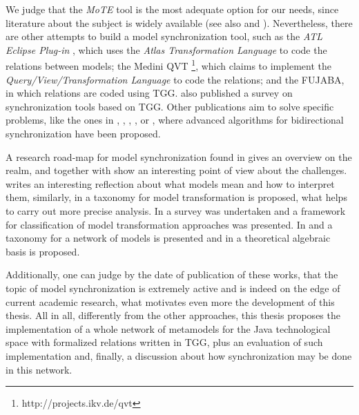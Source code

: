 \documentclass[tuberlin,cic,tc,english,noabntcite,oneside]{iiufrgs}
\begin{document}
We judge that the \emph{MoTE} tool is the most adequate option for our needs, since literature about the subject is widely available (see also \citealp{giese2009efficient} and \citealp{hildebrandt2012mdelab}). Nevertheless, there are other attempts to build a model synchronization tool, such as the \emph{ATL Eclipse Plug-in} \citep{jouault2008atl}, which uses the \emph{Atlas Transformation Language} to code the relations between models; the Medini QVT \footnote{http://projects.ikv.de/qvt}, which claims to implement the \emph{Query/View/Transformation Language} to code the relations; and the FUJABA\citep{nickel2000fujaba}, in which relations are coded using TGG. \citet{hildebrandt2013survey} also published a survey on synchronization tools based on TGG. Other publications aim to solve specific problems, like the ones in \citet{hermann2011correctness}, \citet{xiong2007towards}, \citet{giese2006incremental}, \citet{ivkovic2004tracing}, or \citet{song2011instant}, where advanced algorithms for bidirectional synchronization have been proposed.

A research road-map for model synchronization found in \citet{france2007model} gives an overview on the realm, and together with \citet{mattsson2009linking} show an interesting point of view about the challenges. \citet{seidewitz2003models} writes an interesting reflection about what models mean and how to interpret them, similarly, in \citet{mens2006taxonomy} a taxonomy for model transformation is proposed, what helps to carry out more precise analysis. In \citet{czarnecki2006feature} a survey was undertaken and a framework for classification of model transformation approaches was presented. In \citeauthor{diskin2014towards} \citeyearpar{diskin2014towards} and \citeyearpar{diskin2016three} a taxonomy for a network of models is presented and in \citet{diskin2011model} a theoretical algebraic basis is proposed.

Additionally, one can judge by the date of publication of these works, that the topic of model synchronization is extremely active and is indeed on the edge of current academic research, what motivates even more the development of this thesis. All in all, differently from the other approaches, this thesis proposes the implementation of a whole network of metamodels for the Java technological space with formalized relations written in TGG, plus an evaluation of such implementation and, finally, a discussion about how synchronization may be done in this network. 

\end{document}
